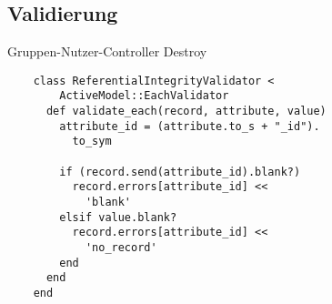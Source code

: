 \subsection{Validierung}

\begin{frame}[fragile]{Gruppen-Nutzer-Controller Destroy}
  \begin{lstlisting}
    class ReferentialIntegrityValidator < 
        ActiveModel::EachValidator
      def validate_each(record, attribute, value)
        attribute_id = (attribute.to_s + "_id").
          to_sym

        if (record.send(attribute_id).blank?)
          record.errors[attribute_id] << 
            'blank'
        elsif value.blank?
          record.errors[attribute_id] << 
            'no_record'
        end
      end
    end
  \end{lstlisting}
\end{frame}

